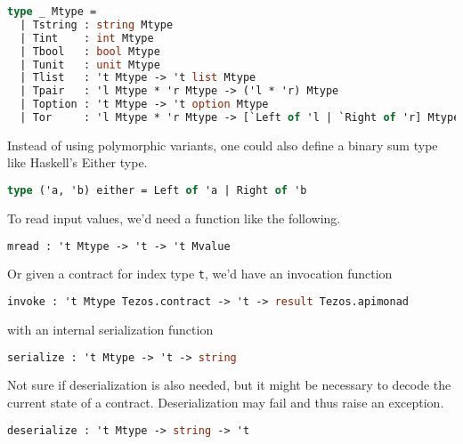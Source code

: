 \documentclass{article}
\begin{document}
\begin{lstlisting}[language=Caml]
type _ Mtype = 
  | Tstring : string Mtype
  | Tint    : int Mtype
  | Tbool   : bool Mtype
  | Tunit   : unit Mtype
  | Tlist   : 't Mtype -> 't list Mtype
  | Tpair   : 'l Mtype * 'r Mtype -> ('l * 'r) Mtype
  | Toption : 't Mtype -> 't option Mtype
  | Tor     : 'l Mtype * 'r Mtype -> [`Left of 'l | `Right of 'r] Mtype
\end{lstlisting}
Instead of using polymorphic variants, one could also define a binary
sum type like Haskell's Either type.
\begin{lstlisting}[language=Caml]
type ('a, 'b) either = Left of 'a | Right of 'b
\end{lstlisting}

To read input values, we'd need a function like the following.
\begin{lstlisting}[language=Caml]
mread : 't Mtype -> 't -> 't Mvalue
\end{lstlisting}

Or given a contract for index type \lstinline/t/, we'd have an
invocation function
\begin{lstlisting}[language=Caml]
invoke : 't Mtype Tezos.contract -> 't -> result Tezos.apimonad
\end{lstlisting}
with an internal serialization function
\begin{lstlisting}[language=Caml]
serialize : 't Mtype -> 't -> string
\end{lstlisting}
Not sure if deserialization is also needed, but it might be necessary
to decode the current state of a contract. Deserialization may fail
and thus raise an exception.
\begin{lstlisting}[language=Caml]
deserialize : 't Mtype -> string -> 't
\end{lstlisting}
\end{document}
